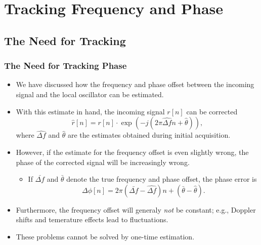
\section{Tracking Frequency and Phase}

\subsection{The Need for Tracking}

\begin{frame}
  \frametitle{The Need for Tracking Phase}
  \begin{itemize}
  \item We have discussed how the frequency and phase offset between
    the incoming signal and the local oscillator can be estimated.
  \item With this estimate in hand, the incoming signal $r[n]$ can be
    corrected
    \[
      \hat{r}[n] = r[n] \cdot \exp(-j (2\pi \hat{\Delta f} n + \hat{\theta})),
    \]
    where $\hat{\Delta f}$ and $\hat{\theta}$ are the estimates
    obtained during initial acquisition.
  \item However, if the estimate for the frequency offset is even
    slightly wrong, the phase of the corrected signal will be
    increasingly wrong.
    \begin{itemize}
    \item If $\bar{\Delta f}$ and $\bar{\theta}$ denote the true
      frequency and phase offset, the phase error is
      \[
        \Delta \phi[n] = 2\pi (\bar{\Delta f} - \hat{\Delta f})n +
        (\bar{\theta} - \hat{\theta}).
      \]
    \end{itemize}
  \item Furthermore, the frequency offset will generaly \emph{not} be
    constant; e.g., Doppler shifts and temerature effects lead to
    fluctuations.
  \item These problems cannot be solved by one-time estimation.
  \end{itemize}
\end{frame}

